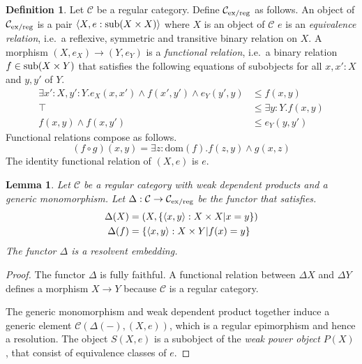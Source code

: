 \documentclass[sort&compress,draft]{elsarticle}
\theoremstyle{plain}
\newtheorem{lemma}[theorem]{Lemma}
\theoremstyle{definition}
\newtheorem{definition}[theorem]{Definition}
\theoremstyle{remark}
\newcommand\hide[1]{}
\newcommand\key[1]{\emph{#1}\label{#1}}
\newcommand\cat\mathcal
\newcommand\set[1]{\left\{#1\right\}}
\newcommand\of:
\newcommand\dom{\mathrm{dom}}
\begin{document}
\begin{definition} Let $\cat C$ be a regular category. Define $\cat C\exreg$ as follows. An object of $\cat C\exreg$ is a pair $\tuple{X,e\of \sub(X\times X)}$ where $X$ is an object of $\cat C$ $e$ is an \key{equivalence relation}, i.e.\ a reflexive, symmetric and transitive binary relation on $X$. A morphism $(X,e_X)\to(Y,e_Y)$ is a \key{functional relation}, i.e.\ a binary relation $f\in \mathrm{sub}(X\times Y)$ that satisfies the following equations of subobjects for all $x,x'\of X$ and $y,y'$ of $Y$.
\begin{align*}
\exists x'\of X,y'\of Y.e_X(x,x')\land f(x',y')\land e_Y(y',y) &\leq f(x,y) \\
\top &\leq \exists y\of Y.f(x,y) \\
f(x,y)\land f(x,y') &\leq e_Y(y,y')
\end{align*} %
Functional relations compose as follows.
\[ (f \circ g)(x,y) = \exists z\of \dom(f).f(z,y)\land g(x,z) \]
The identity functional relation of $(X,e)$ is $e$.
\end{definition}

\begin{lemma} Let $\cat C$ be a regular category with weak dependent products and a generic monomorphism.
Let $\Delta\of \cat C\to\cat C\exreg$ be the functor that satisfies. 
\begin{align*}
\Delta(X) &= (X,\set{\tuple{x,y}\of X\times X| x=y})\\
\Delta(f) &= \set{\tuple{x,y}\of X\times Y|f(x)=y}
\end{align*}
The functor $\Delta$ is a resolvent embedding.
\end{lemma}

\begin{proof} The functor $\Delta$ is fully faithful. A functional relation between $\Delta X$ and $\Delta Y$ defines a morphism $X\to Y$ because $\cat C$ is a regular category.

The generic monomorphism and weak dependent product together induce a generic element $\cat C(\Delta(-),(X,e))$, which is a regular epimorphism and hence a resolution.%
The object $S(X,e)$ is a subobject of the \emph{weak power object} $P(X)$, that consist of equivalence classes of $e$. %
\hide{which we construct how? 

Image of:
 \[ \set{ \xi\of P(X)| \exists x\of X.\forall y\of Y. e(x,y) \iff y\in \xi }\] 

The object of inhabited subobjects $P(X)$ comes from the epi-mono factorization of $X\times P(X) \to P(X)$

$\cat C$ is Heyting thanks to the weak dependent products. Why not use that?

The morphism $\forall_f$ takes image of the weak dependent product along $f\of X\to Y$.
}


\end{proof}
\end{document}
